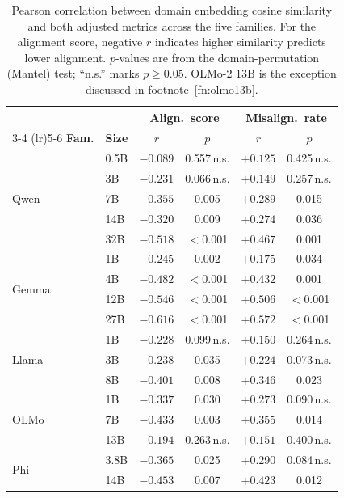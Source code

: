 \documentclass{article}
\begin{document}
\begin{table}[H]
\captionsetup{font=normalsize,skip=3pt}
\caption{Pearson correlation between domain embedding cosine similarity and both adjusted metrics across the five families. For the alignment score, negative $r$ indicates higher similarity predicts lower alignment. $p$-values are from the domain-permutation (Mantel) test; ``n.s.'' marks $p\geq0.05$. OLMo-2 13B is the exception discussed in footnote~\ref{fn:olmo13b}.}
\label{tab:similarity-results}
\centering
\scriptsize
\renewcommand{\arraystretch}{0.84}
\setlength{\tabcolsep}{2pt}
\begin{tabular}{llcccc}
\toprule
& & \multicolumn{2}{c}{\textbf{Align.\ score}} & \multicolumn{2}{c}{\textbf{Misalign.\ rate}} \\
\cmidrule(lr){3-4} \cmidrule(lr){5-6}
\textbf{Fam.} & \textbf{Size} & \textbf{$r$} & \textbf{$p$} & \textbf{$r$} & \textbf{$p$} \\
\midrule
\multirow{5}{*}{Qwen}
 & 0.5B & $-0.089$ & 0.557\,n.s. & $+0.125$ & 0.425\,n.s. \\
 & 3B   & $-0.231$ & 0.066\,n.s. & $+0.149$ & 0.257\,n.s. \\
 & 7B   & $-0.355$ & 0.005       & $+0.289$ & 0.015       \\
 & 14B  & $-0.320$ & 0.009       & $+0.274$ & 0.036       \\
 & 32B  & $-0.518$ & $<$0.001    & $+0.467$ & 0.001       \\
\midrule
\multirow{4}{*}{Gemma}
 & 1B   & $-0.245$ & 0.002       & $+0.175$ & 0.034       \\
 & 4B   & $-0.482$ & $<$0.001    & $+0.432$ & 0.001       \\
 & 12B  & $-0.546$ & $<$0.001    & $+0.506$ & $<$0.001    \\
 & 27B  & $-0.616$ & $<$0.001    & $+0.572$ & $<$0.001    \\
\midrule
\multirow{3}{*}{Llama}
 & 1B   & $-0.228$ & 0.099\,n.s. & $+0.150$ & 0.264\,n.s. \\
 & 3B   & $-0.238$ & 0.035       & $+0.224$ & 0.073\,n.s. \\
 & 8B   & $-0.401$ & 0.008       & $+0.346$ & 0.023       \\
\midrule
\multirow{3}{*}{OLMo}
 & 1B   & $-0.337$ & 0.030       & $+0.273$ & 0.090\,n.s. \\
 & 7B   & $-0.433$ & 0.003       & $+0.355$ & 0.014       \\
 & 13B  & $-0.194$ & 0.263\,n.s. & $+0.151$ & 0.400\,n.s. \\
\midrule
\multirow{2}{*}{Phi}
 & 3.8B & $-0.365$ & 0.025       & $+0.290$ & 0.084\,n.s. \\
 & 14B  & $-0.453$ & 0.007       & $+0.423$ & 0.012       \\
\bottomrule
\end{tabular}
\end{table}
\end{document}
